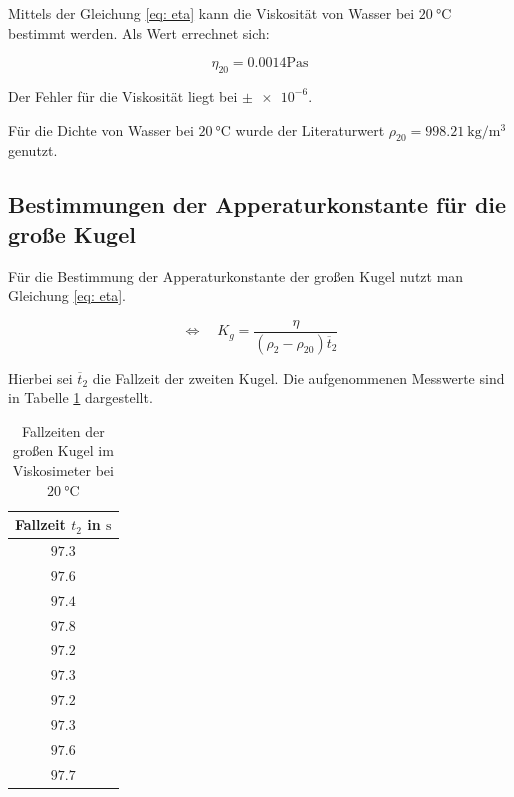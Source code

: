 Mittels der Gleichung \eqref{eq: eta} kann die Viskosität
von Wasser bei $\SI{20}{\degreeCelsius}$ bestimmt werden.
Als Wert errechnet sich:

\begin{equation}
\label{eq:viskosi_wasser}
\eta_{20}= \num{0.0014} \si{\pascal\second}
\end{equation}

Der Fehler für die Viskosität liegt bei $\pm\num{e-6}$. %

Für die Dichte von Wasser bei $\SI{20}{\degreeCelsius}$ wurde der Literaturwert $\rho_{20}=\SI{998.21}{\kilogram\per\cubic\meter}$
genutzt\cite{lit_dichte}.

\subsection{Bestimmungen der Apperaturkonstante für die große Kugel}
Für die Bestimmung der Apperaturkonstante der großen Kugel nutzt man Gleichung \eqref{eq: eta}.

\begin{equation*}
\Leftrightarrow \quad K_{g}=\frac{\eta}{\left(\rho_2-\rho_{20}\right)\overline{t}_2}
\end{equation*}

Hierbei sei $\overline{t}_2$ die Fallzeit der zweiten Kugel.
Die aufgenommenen Messwerte sind in Tabelle \ref{tab:messwerte_fallzeit_kugel_gross} dargestellt.

\begin{table}
\centering
\begin{tabular} {c}
  \toprule
  Fallzeit $t_2$ in $\si{\second}$ \\
  \midrule
  $\num{97.3}$ \\
  $\num{97.6}$ \\
  $\num{97.4}$ \\
  $\num{97.8}$ \\
  $\num{97.2}$ \\
  $\num{97.3}$ \\
  $\num{97.2}$ \\
  $\num{97.3}$ \\
  $\num{97.6}$ \\
  $\num{97.7}$ \\
\bottomrule
\end{tabular}
\caption{Fallzeiten der großen Kugel im Viskosimeter bei $\SI{20}{\degreeCelsius}$}
\label{tab:messwerte_fallzeit_kugel_gross}
\end{table}

